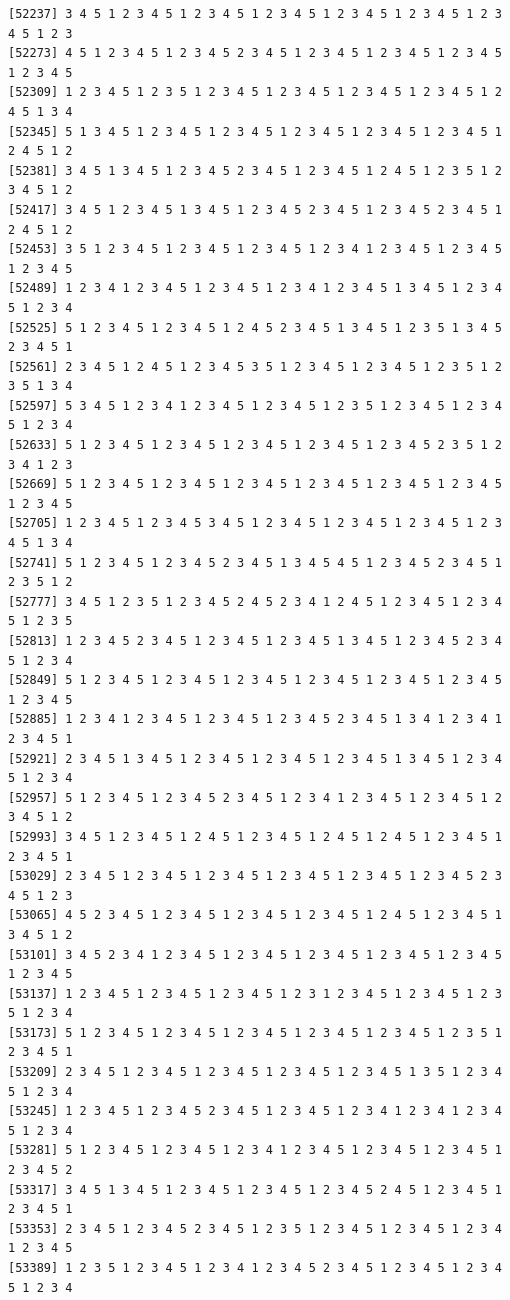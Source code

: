 \documentclass[
  11pt,
]{book}
\begin{document}
\begin{verbatim}
[52237] 3 4 5 1 2 3 4 5 1 2 3 4 5 1 2 3 4 5 1 2 3 4 5 1 2 3 4 5 1 2 3 4 5 1 2 3
[52273] 4 5 1 2 3 4 5 1 2 3 4 5 2 3 4 5 1 2 3 4 5 1 2 3 4 5 1 2 3 4 5 1 2 3 4 5
[52309] 1 2 3 4 5 1 2 3 5 1 2 3 4 5 1 2 3 4 5 1 2 3 4 5 1 2 3 4 5 1 2 4 5 1 3 4
[52345] 5 1 3 4 5 1 2 3 4 5 1 2 3 4 5 1 2 3 4 5 1 2 3 4 5 1 2 3 4 5 1 2 4 5 1 2
[52381] 3 4 5 1 3 4 5 1 2 3 4 5 2 3 4 5 1 2 3 4 5 1 2 4 5 1 2 3 5 1 2 3 4 5 1 2
[52417] 3 4 5 1 2 3 4 5 1 3 4 5 1 2 3 4 5 2 3 4 5 1 2 3 4 5 2 3 4 5 1 2 4 5 1 2
[52453] 3 5 1 2 3 4 5 1 2 3 4 5 1 2 3 4 5 1 2 3 4 1 2 3 4 5 1 2 3 4 5 1 2 3 4 5
[52489] 1 2 3 4 1 2 3 4 5 1 2 3 4 5 1 2 3 4 1 2 3 4 5 1 3 4 5 1 2 3 4 5 1 2 3 4
[52525] 5 1 2 3 4 5 1 2 3 4 5 1 2 4 5 2 3 4 5 1 3 4 5 1 2 3 5 1 3 4 5 2 3 4 5 1
[52561] 2 3 4 5 1 2 4 5 1 2 3 4 5 3 5 1 2 3 4 5 1 2 3 4 5 1 2 3 5 1 2 3 5 1 3 4
[52597] 5 3 4 5 1 2 3 4 1 2 3 4 5 1 2 3 4 5 1 2 3 5 1 2 3 4 5 1 2 3 4 5 1 2 3 4
[52633] 5 1 2 3 4 5 1 2 3 4 5 1 2 3 4 5 1 2 3 4 5 1 2 3 4 5 2 3 5 1 2 3 4 1 2 3
[52669] 5 1 2 3 4 5 1 2 3 4 5 1 2 3 4 5 1 2 3 4 5 1 2 3 4 5 1 2 3 4 5 1 2 3 4 5
[52705] 1 2 3 4 5 1 2 3 4 5 3 4 5 1 2 3 4 5 1 2 3 4 5 1 2 3 4 5 1 2 3 4 5 1 3 4
[52741] 5 1 2 3 4 5 1 2 3 4 5 2 3 4 5 1 3 4 5 4 5 1 2 3 4 5 2 3 4 5 1 2 3 5 1 2
[52777] 3 4 5 1 2 3 5 1 2 3 4 5 2 4 5 2 3 4 1 2 4 5 1 2 3 4 5 1 2 3 4 5 1 2 3 5
[52813] 1 2 3 4 5 2 3 4 5 1 2 3 4 5 1 2 3 4 5 1 3 4 5 1 2 3 4 5 2 3 4 5 1 2 3 4
[52849] 5 1 2 3 4 5 1 2 3 4 5 1 2 3 4 5 1 2 3 4 5 1 2 3 4 5 1 2 3 4 5 1 2 3 4 5
[52885] 1 2 3 4 1 2 3 4 5 1 2 3 4 5 1 2 3 4 5 2 3 4 5 1 3 4 1 2 3 4 1 2 3 4 5 1
[52921] 2 3 4 5 1 3 4 5 1 2 3 4 5 1 2 3 4 5 1 2 3 4 5 1 3 4 5 1 2 3 4 5 1 2 3 4
[52957] 5 1 2 3 4 5 1 2 3 4 5 2 3 4 5 1 2 3 4 1 2 3 4 5 1 2 3 4 5 1 2 3 4 5 1 2
[52993] 3 4 5 1 2 3 4 5 1 2 4 5 1 2 3 4 5 1 2 4 5 1 2 4 5 1 2 3 4 5 1 2 3 4 5 1
[53029] 2 3 4 5 1 2 3 4 5 1 2 3 4 5 1 2 3 4 5 1 2 3 4 5 1 2 3 4 5 2 3 4 5 1 2 3
[53065] 4 5 2 3 4 5 1 2 3 4 5 1 2 3 4 5 1 2 3 4 5 1 2 4 5 1 2 3 4 5 1 3 4 5 1 2
[53101] 3 4 5 2 3 4 1 2 3 4 5 1 2 3 4 5 1 2 3 4 5 1 2 3 4 5 1 2 3 4 5 1 2 3 4 5
[53137] 1 2 3 4 5 1 2 3 4 5 1 2 3 4 5 1 2 3 1 2 3 4 5 1 2 3 4 5 1 2 3 5 1 2 3 4
[53173] 5 1 2 3 4 5 1 2 3 4 5 1 2 3 4 5 1 2 3 4 5 1 2 3 4 5 1 2 3 5 1 2 3 4 5 1
[53209] 2 3 4 5 1 2 3 4 5 1 2 3 4 5 1 2 3 4 5 1 2 3 4 5 1 3 5 1 2 3 4 5 1 2 3 4
[53245] 1 2 3 4 5 1 2 3 4 5 2 3 4 5 1 2 3 4 5 1 2 3 4 1 2 3 4 1 2 3 4 5 1 2 3 4
[53281] 5 1 2 3 4 5 1 2 3 4 5 1 2 3 4 1 2 3 4 5 1 2 3 4 5 1 2 3 4 5 1 2 3 4 5 2
[53317] 3 4 5 1 3 4 5 1 2 3 4 5 1 2 3 4 5 1 2 3 4 5 2 4 5 1 2 3 4 5 1 2 3 4 5 1
[53353] 2 3 4 5 1 2 3 4 5 2 3 4 5 1 2 3 5 1 2 3 4 5 1 2 3 4 5 1 2 3 4 1 2 3 4 5
[53389] 1 2 3 5 1 2 3 4 5 1 2 3 4 1 2 3 4 5 2 3 4 5 1 2 3 4 5 1 2 3 4 5 1 2 3 4

\end{verbatim}
\end{document}
